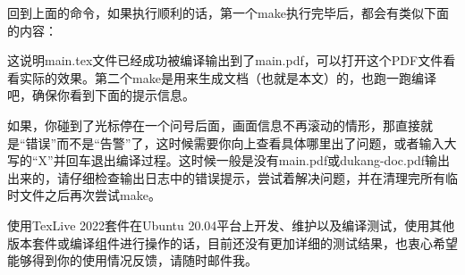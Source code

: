 回到上面的命令，如果执行顺利的话，第一个make执行完毕后，都会有类似下面的内容：

\vspace{1em}
\begin{center}
\end{center}
\vspace{1em}

这说明main.tex文件已经成功被编译输出到了main.pdf，可以打开这个PDF文件看看实际的效果。第二个make是用来生成{\dk}文档（也就是本文）的，也跑一跑编译吧，确保你看到下面的提示信息。

\vspace{1em}
\begin{center}
\end{center}
\vspace{1em}

如果，你碰到了光标停在一个问号后面，画面信息不再滚动的情形，那直接就是“错误”而不是“告警”了，这时候需要你向上查看具体哪里出了问题，或者输入大写的“X”并回车退出编译过程。这时候一般是没有main.pdf或dukang-doc.pdf输出出来的，请仔细检查输出日志中的错误提示，尝试着解决问题，并在清理完所有临时文件之后再次尝试make。

\begin{dkcomment}[关于兼容性]
  {\hspace{2em}}{\dk}使用TexLive 2022套件在Ubuntu 20.04平台上开发、维护以及编译测试，使用其他版本套件或编译组件进行操作的话，目前还没有更加详细的测试结果，也衷心希望能够得到你的使用情况反馈，请随时邮件我。
\end{dkcomment}


\clearpage
